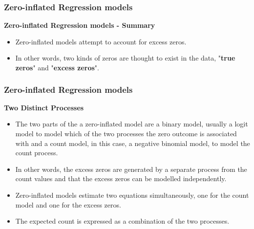 \documentclass[MASTER.tex]{subfiles}
\begin{document}
	

\begin{frame}[fragile]
	\frametitle{Zero-inflated Regression models}
	\Large
	\textbf{Zero-inflated Regression models - Summary}
	\begin{itemize}
		\item Zero-inflated models attempt to account for excess zeros. 
		\item In other words, two kinds of zeros are thought to exist in the data, "\textbf{true zeros}" and "\textbf{excess zeros}". 
	\end{itemize}
\end{frame}

\begin{frame}[fragile]
	\frametitle{Zero-inflated Regression models}
	\large
	\textbf{Two Distinct Processes}
	\begin{itemize}
		\item The two parts of the a zero-inflated model are a binary model, usually a logit model to model which of the two processes the zero outcome is associated with and a count model, in this case, a negative binomial model, to model the count process. 
		\item In other words, the excess zeros are generated by a separate process from the count values and that the excess zeros can be modelled independently. 
		\item Zero-inflated models estimate two equations simultaneously, one for the count model and one for the excess zeros.
\item The expected count is expressed as a combination of the two processes.
		
	\end{itemize}
\end{frame}
\end{document}
